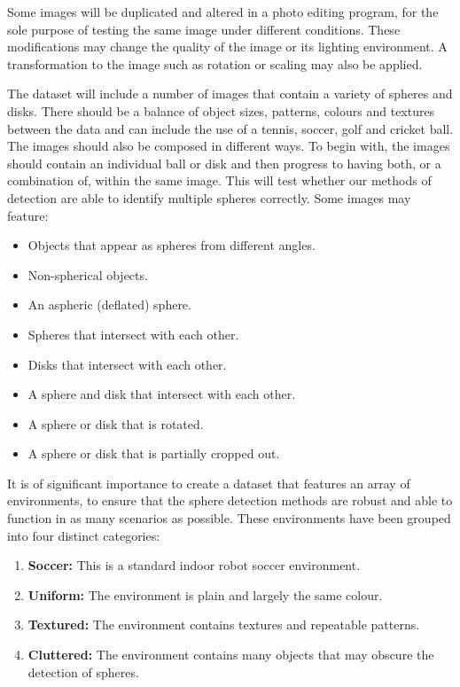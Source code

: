 \documentclass[11pt]{scrartcl}
\begin{document}
{{        	Some images will be duplicated and altered in a photo editing program,
        	for the sole purpose of testing the same image under different 
        	conditions. These modifications may change the quality of the image or
        	its lighting environment. A transformation to the image such as rotation
        	or scaling may also be applied.

        	The dataset will include a number of images that contain a variety of
        	spheres and disks. There should be a balance of object sizes, patterns,
        	colours and textures between the data and can include the use of a
        	tennis, soccer, golf and cricket ball. The images should also be
        	composed in different ways. To begin with, the images should contain an
        	individual ball or disk and then progress to having both, or a 
        	combination of, within the same image. This will test whether our
        	methods of detection are able to identify multiple spheres correctly.
			Some images may feature:

        	\begin{itemize}
        		\item Objects that appear as spheres from different angles.
        		\item Non-spherical objects.
        		\item An aspheric (deflated) sphere.
        		\item Spheres that intersect with each other.
        		\item Disks that intersect with each other.
        		\item A sphere and disk that intersect with each other.
        		\item A sphere or disk that is rotated.
        		\item A sphere or disk that is partially cropped out.
        	\end{itemize}

        	It is of significant importance to create a dataset that features an
        	array of environments, to ensure that the sphere detection methods are
        	robust and able to function in as many scenarios as possible. These
        	environments have been grouped into four distinct categories:

        	\begin{enumerate}
        		\item \textbf{Soccer:} This is a standard indoor robot soccer 
        		environment.
        		\item \textbf{Uniform:} The environment is plain and largely the same
        		colour.
        		\item \textbf{Textured:} The environment contains textures and
        		repeatable patterns.
        		\item \textbf{Cluttered:} The environment contains many objects that
        		may obscure the detection of spheres.
        	\end{enumerate}
        	
}}
\end{document}
